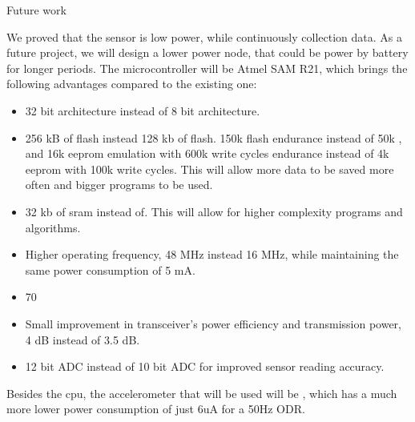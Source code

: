 Future work

We proved that the sensor is low power, while continuously collection data. As a future project, we will design a lower power node, that could be power by battery for longer periods. The microcontroller will be Atmel SAM R21, which brings the following advantages compared to the existing one:

\begin{itemize}
    \item 32 bit architecture instead of 8 bit architecture.
    \item 256 kB of flash instead 128 kb of flash. 150k flash endurance instead of 50k , and 16k eeprom emulation with 600k write cycles endurance instead of 4k eeprom with 100k write cycles. This will allow more data to be saved more often and bigger programs to be used.
    \item 32 kb of sram instead of. This will allow for higher complexity programs and algorithms.
    \item Higher operating frequency, 48 MHz instead 16 MHz, while maintaining the same power consumption of 5 mA.
    \item 70%
    \item Small improvement in transceiver's power efficiency and transmission power, 4 dB instead of 3.5 dB.
    \item 12 bit ADC instead of 10 bit ADC for improved sensor reading accuracy.
\end{itemize}

Besides the cpu, the accelerometer that will be used will be , which has a much more lower power consumption of just 6uA for a 50Hz ODR.